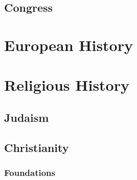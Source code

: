 		\subsection{Congress}
		
	
		
		
	\section{European History}
	\section{Religious History}
		\subsection{Judaism}
		\subsection{Christianity}
			\subsubsection{Foundations}
			\newpage
